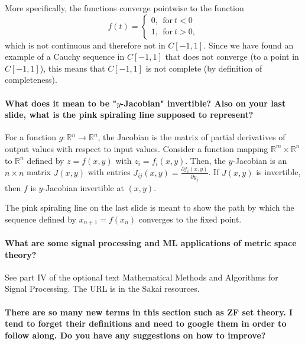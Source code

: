 \documentclass[10pt,english]{article}
\begin{document}
More specifically, the functions converge pointwise to the function
\[ f(t) = \begin{cases} 0,~~ \text{for}~t<0 \\ 1, ~~ \text{for}~t> 0 ,\end{cases} \] which is not continuous and therefore not in $C[-1,1]$.
Since we have found an example of a Cauchy sequence in $C[-1,1]$ that does not converge (to a point in $C[-1,1]$), this means that $C[-1,1]$ is not complete (by definition of completeness).\\

\paragraph{What does it mean to be "$y$-Jacobian" invertible? Also on your last slide, what is the pink spiraling line supposed to represent?}
For a function $g \colon \mathbb{R}^n \to \mathbb{R}^n$, the Jacobian is the matrix of partial derivatives of output values with respect to input values.
Consider a function mapping $\mathbb{R}^m \times \mathbb{R}^n$ to $\mathbb{R}^n$ defined by $z = f (x,y)$ with $z_i = f_i (x,y)$.
Then, the $y$-Jacobian is an $n\times n$ matrix $J (x,y)$ with entries $J_{ij} (x,y) = \frac{\partial f_i (x,y)}{\partial y_j}$.
If $J(x,y)$ is invertible, then $f$ is $y$-Jacobian invertible at $(x,y)$.


The pink spiraling line on the last slide is meant to show the path by which the sequence defined by $x_{n+1} = f(x_n)$ converges to the fixed point.


\paragraph{What are some signal processing and ML applications of metric space theory?}

See part IV of the optional text Mathematical Methods and Algorithms for Signal Processing.
The URL is in the Sakai resources.

\paragraph{There are so many new terms in this section such as ZF set theory. I tend to forget their definitions and need to google them in order to follow along. Do you have any suggestions on how to improve?}
\end{document}
